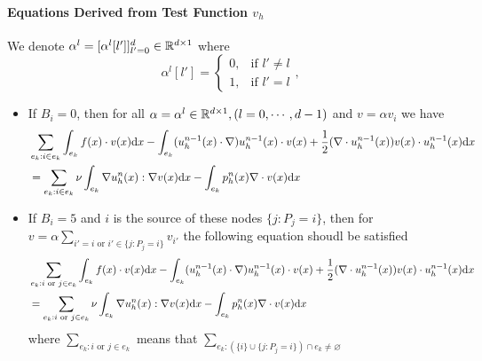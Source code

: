 \paragraph{Equations Derived from Test Function $v_h$}
We denote $\alpha^l=[\alpha^l[l']]_{l'=0}^d\in\mathbb{R}^{d\times1}$ where
\begin{equation}\label{eq:basis-alpha}
  \alpha^l[l']=\left\{
    \begin{array}{ll}
      0, & \text{if } l'\neq l \\
      1, & \text{if } l'=l
    \end{array}\right.,
\end{equation}
\begin{itemize}
  \item If $B_i=0$, then for all $\alpha=\alpha^l\in\mathbb{R}^{d\times1},(l=0,\cdots,d-1)$ and $v=\alpha v_{i}$ we have
    \begin{equation}\label{eq:equation-testv-interior}
      \begin{split}
        &\sum_{e_{k}:i\in e_{k}}\int_{e_{k}}f(x)\cdot v(x)\mathrm{d} x
        -\int_{e_{k}}(u_h^{n-1}(x)\cdot\nabla)u_h^{n-1}(x)\cdot v(x)+\frac{1}{2}(\nabla\cdot u_h^{n-1}(x))v(x)\cdot u_h^{n-1}(x)\mathrm{d} x \\
        &=\sum_{e_{k}:i\in e_{k}}\nu\int_{e_{k}}\nabla u_h^n(x):\nabla v(x)\mathrm{d} x-\int_{e_{k}}p_h^n(x)\nabla\cdot v(x)\mathrm{d} x 
      \end{split}
    \end{equation}
  \item If $B_i=5$ and $i$ is the source of these nodes $\{j:P_j=i\}$, 
    then for $v=\alpha\sum_{i'=i\text{ or }i'\in\{j:P_j=i\}}v_{i'}$ the following equation shoudl be satisfied
    \begin{equation}\label{eq:equation-testv-period}
      \begin{split}
        &\sum_{e_{k}:i\text{ or }j\in e_{k}}\int_{e_{k}}f(x)\cdot v(x)\mathrm{d} x
        -\int_{e_{k}}(u_h^{n-1}(x)\cdot\nabla)u_h^{n-1}(x)\cdot v(x)+\frac{1}{2}(\nabla\cdot u_h^{n-1}(x))v(x)\cdot u_h^{n-1}(x)\mathrm{d} x \\
        &=\sum_{e_{k}:i\text{ or }j\in e_{k}}\nu\int_{e_{k}}\nabla u_h^n(x):\nabla v(x)\mathrm{d} x-\int_{e_{k}}p_h^n(x)\nabla\cdot v(x)\mathrm{d} x 
      \end{split}
    \end{equation}
    where $\sum_{e_{k}:i\text{ or }j\in e_{k}}$ means that $\sum_{e_k:(\{i\}\cup\{j:P_j=i\})\cap e_k\neq\varnothing}$
\end{itemize}

